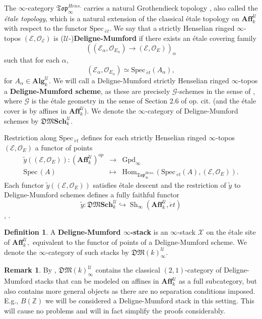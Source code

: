 \documentclass[12pt]{amsart}
\theoremstyle{definition}
\newtheorem{definition}[dummy]{Definition}
\newtheorem{remark}[dummy]{Remark}
\newcommand{\cE}{\mathcal{E}}
\newcommand{\cG}{\mathcal{G}}
\newcommand{\cO}{\mathcal{O}}
\newcommand{\cU}{\mathcal{U}}
\newcommand{\cX}{\mathcal{X}}
\newcommand{\Affku}{\mathbf{Aff}^{\cU}_{k}}
\newcommand{\Topi}{\mathfrak{Top}_\i}
\newcommand{\Spec}{\mathrm{Spec}\,}
\newcommand{\Sh}{\operatorname{Sh}}
\newcommand{\Hom}{\mathrm{Hom}}
\newcommand{\et}{\acute{e}t}
\def\Sch{\mathbf{Sch}}
\renewcommand{\i}{\infty}
\def\iGpd{\operatorname{Gpd}_\i}
\def\Shi{\Sh_\i}
\def\Htop{\Topi^{\mathit{Hens.}}}
\def\Algku{\mathbf{Alg}^{\cU}_{k}}
\def\Dmsch{\mathfrak{DM}\Sch^\cU_k}
\begin{document}
The $\i$-category $\Htop$ carries a natural Grothendieck topology \cite[Definition 4.3.2]{higherdave}, also called the \emph{\'etale topology}, which is a natural extension of the classical \'etale topology on $\Affku$ with respect to the functor $\Spec_{\et}.$ We say that a strictly Henselian ringed $\i$-topos $\left(\cE,\cO_{\cE}\right)$ is ($\cU$-)\textbf{Deligne-Mumford} if there exists an \'etale covering family $$\left(\left(\cE_\alpha,\cO_{E_\alpha}\right) \to \left(\cE,\cO_{E}\right)\right)_\alpha$$ such that for each $\alpha,$ $$\left(\cE_\alpha,\cO_{E_\alpha}\right) \simeq \Spec_{\et}\left(A_\alpha\right),$$ for $A_\alpha \in \Algku.$ We will call a Deligne-Mumford strictly Henselian ringed $\i$-topos a \textbf{Deligne-Mumford scheme}, as these are precisely $\cG$-schemes in the sense of \cite[Definition 2.3.9]{dagv}, where $\cG$ is the \'etale geometry in the sense of Section 2.6 of op. cit. (and the \'etale cover is by affines in $\Affku$). We denote the $\i$-category of Deligne-Mumford schemes by $\Dmsch.$

Restriction along $\Spec_{\et}$ defines for each strictly Henselian ringed $\i$-topos $\left(\cE,\cO_{E}\right)$ a functor of points
\begin{eqnarray*}
\tilde y\left(\left(\cE,\cO_{E}\right)\right):\left(\Affku\right)^{op} &\to& \iGpd\\
\Spec\left(A\right) &\mapsto& \Hom_{\Htop}\left(\Spec_{\et}\left(A\right),\left(\cE,\cO_{E}\right)\right).
\end{eqnarray*}
Each functor $\tilde y\left(\left(\cE,\cO_{E}\right)\right)$ satisfies \'etale descent and the restriction of $\tilde y$ to Deligne-Mumford schemes defines a fully faithful functor $$\tilde y:\Dmsch \hookrightarrow \Shi\left(\Affku,\et\right)$$ \cite[Theorem 2.4.1, Lemma 2.4.13]{dagv}, \cite[Theorem 5.2.2, Remark 5.2.3]{higherdave}.

\begin{definition}
A \textbf{Deligne-Mumford $\i$-stack} is an $\i$-stack $\cX$ on the \'etale site of $\Affku,$ equivalent to the functor of points of a Deligne-Mumford scheme. We denote the $\i$-category of such stacks by $\mathfrak{DM}\left(k\right)_\i^{\cU}.$
\end{definition}

\begin{remark}
By \cite[Theorem 2.6.18]{dagv}, $\mathfrak{DM}\left(k\right)_\i^{\cU}$ contains the classical $\left(2,1\right)$-category of Deligne-Mumford stacks that can be modeled on affines in $\Affku$ as a full subcategory, but also contains more general objects as there are no separation conditions imposed. E.g., $B\left(\mathbb{Z}\right)$ we will be considered a Deligne-Mumford stack in this setting. This will cause no problems and will in fact simplify the proofs considerably.
\end{remark}
\end{document}
